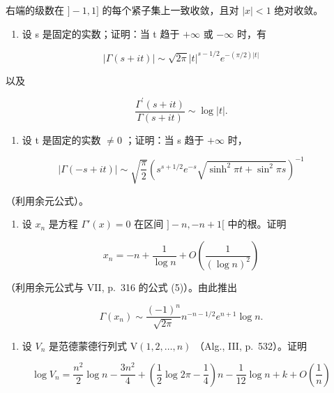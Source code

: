 右端的级数在 \(]-1,1]\) 的每个紧子集上一致收敛，且对 \(|x|<1\) 绝对收敛。

\begin{enumerate}
\def\labelenumi{\arabic{enumi})}
\setcounter{enumi}{2}
\tightlist
\item
  设 s 是固定的实数；证明：当 t 趋于 \(+\infty\) 或 \(-\infty\) 时，有
\end{enumerate}

\[
| \Gamma (s + i t) | \sim \sqrt {2 \pi} | t | ^ {s - 1 / 2} e ^ {- (\pi / 2) | t |}
\]

以及

\[
\frac {\Gamma^ {\prime} (s + i t)}{\Gamma (s + i t)} \sim \log | t |.
\]

\begin{enumerate}
\def\labelenumi{\arabic{enumi})}
\setcounter{enumi}{3}
\tightlist
\item
  设 t 是固定的实数 \(\neq 0\) ；证明：当 s 趋于 \(+\infty\) 时，
\end{enumerate}

\[
| \Gamma (- s + i t) | \sim \sqrt {\frac {\pi}{2}} \left(s ^ {s + 1 / 2} e ^ {- s} \sqrt {\sinh^ {2} \pi t + \sin^ {2} \pi s}\right) ^ {- 1}
\]

（利用余元公式）。

\begin{enumerate}
\def\labelenumi{\arabic{enumi})}
\setcounter{enumi}{4}
\tightlist
\item
  设 \(x_{n}\) 是方程 \(\Gamma'(x) = 0\) 在区间 \(] - n, -n + 1[\) 中的根。证明
\end{enumerate}

\[
x _ {n} = - n + \frac {1}{\log n} + O \left(\frac {1}{(\log n) ^ {2}}\right)
\]

（利用余元公式与 VII, p.~316 的公式 (5)）。由此推出

\[
\Gamma (x _ {n}) \sim \frac {(- 1) ^ {n}}{\sqrt {2 \pi}} n ^ {- n - 1 / 2} e ^ {n + 1} \log n.
\]

\begin{enumerate}
\def\labelenumi{\arabic{enumi})}
\setcounter{enumi}{5}
\tightlist
\item
  设 \(V_{n}\) 是范德蒙德行列式 \(\mathrm{V}(1,2,\dots,n)\) （Alg., III, p.~532）。证明
\end{enumerate}

\[
\log V _ {n} = \frac {n ^ {2}}{2} \log n - \frac {3 n ^ {2}}{4} + \left(\frac {1}{2} \log 2 \pi - \frac {1}{4}\right) n - \frac {1}{12} \log n + k + O \left(\frac {1}{n}\right)
\]

